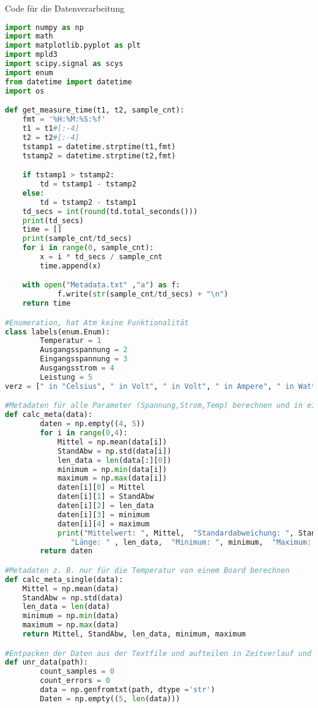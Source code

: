 \newpage
Code für die Datenverarbeitung  \\

\begin{lstlisting}[language = Python]
import numpy as np
import math
import matplotlib.pyplot as plt
import mpld3
import scipy.signal as scys
import enum
from datetime import datetime
import os

def get_measure_time(t1, t2, sample_cnt):
    fmt = '%H:%M:%S:%f'
    t1 = t1#[:-4]
    t2 = t2#[:-4]
    tstamp1 = datetime.strptime(t1,fmt)
    tstamp2 = datetime.strptime(t2,fmt)

    if tstamp1 > tstamp2:
        td = tstamp1 - tstamp2
    else:
        td = tstamp2 - tstamp1
    td_secs = int(round(td.total_seconds()))
    print(td_secs)
    time = []
    print(sample_cnt/td_secs)
    for i in range(0, sample_cnt):
        x = i * td_secs / sample_cnt
        time.append(x)

    with open("Metadata.txt" ,"a") as f:
            f.write(str(sample_cnt/td_secs) + "\n")
    return time

#Enumeration, hat Atm keine Funktionalität
class labels(enum.Enum):
        Temperatur = 1
        Ausgangsspannung = 2
        Eingangsspannung = 3
        Ausgangsstrom = 4
        Leistung = 5
verz = [" in °Celsius", " in Volt", " in Volt", " in Ampere", " in Watt"]

#Metadaten für alle Parameter (Spannung,Strom,Temp) berechnen und in einem 2D Array speichern
def calc_meta(data):
        daten = np.empty((4, 5))
        for i in range(0,4):
            Mittel = np.mean(data[i])
            StandAbw = np.std(data[i])
            len_data = len(data[:][0])
            minimum = np.min(data[i])
            maximum = np.max(data[i])
            daten[i][0] = Mittel
            daten[i][1] = StandAbw
            daten[i][2] = len_data
            daten[i][3] = minimum
            daten[i][4] = maximum
            print("Mittelwert: ", Mittel,  "Standardabweichung: ", StandAbw,
               "Länge: " , len_data,  "Minimum: ", minimum,  "Maximum: ", maximum)
        return daten

#Metadaten z. B. nur für die Temperatur von einem Board berechnen
def calc_meta_single(data):
    Mittel = np.mean(data)
    StandAbw = np.std(data)
    len_data = len(data)
    minimum = np.min(data)
    maximum = np.max(data)
    return Mittel, StandAbw, len_data, minimum, maximum

#Entpacken der Daten aus der Textfile und aufteilen in Zeitverlauf und Daten
def unr_data(path):
        count_samples = 0
        count_errors = 0
        data = np.genfromtxt(path, dtype ='str')
        Daten = np.empty((5, len(data)))


\end{lstlisting}
